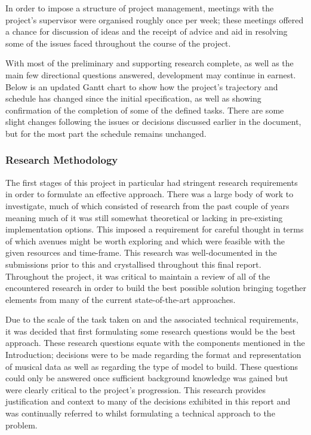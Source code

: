 \documentclass[12pt,]{article}
\begin{document}
In order to impose a structure of project management, meetings with the
project's supervisor were organised roughly once per week; these
meetings offered a chance for discussion of ideas and the receipt of
advice and aid in resolving some of the issues faced throughout the
course of the project.

With most of the preliminary and supporting research complete, as well
as the main few directional questions answered, development may continue
in earnest. Below is an updated Gantt chart to show how the project's
trajectory and schedule has changed since the initial specification, as
well as showing confirmation of the completion of some of the defined
tasks. There are some slight changes following the issues or decisions
discussed earlier in the document, but for the most part the schedule
remains unchanged.

\hypertarget{research-methodology}{%
\subsubsection{Research Methodology}\label{research-methodology}}

The first stages of this project in particular had stringent research
requirements in order to formulate an effective approach. There was a
large body of work to investigate, much of which consisted of research
from the past couple of years meaning much of it was still somewhat
theoretical or lacking in pre-existing implementation options. This
imposed a requirement for careful thought in terms of which avenues
might be worth exploring and which were feasible with the given
resources and time-frame. This research was well-documented in the
submissions prior to this and crystallised throughout this final report.
Throughout the project, it was critical to maintain a review of all of
the encountered research in order to build the best possible solution
bringing together elements from many of the current state-of-the-art
approaches.

Due to the scale of the task taken on and the associated technical
requirements, it was decided that first formulating some research
questions would be the best approach. These research questions equate
with the components mentioned in the Introduction; decisions were to be
made regarding the format and representation of musical data as well as
regarding the type of model to build. These questions could only be
answered once sufficient background knowledge was gained but were
clearly critical to the project's progression. This research provides
justification and context to many of the decisions exhibited in this
report and was continually referred to whilst formulating a technical
approach to the problem.
\end{document}

